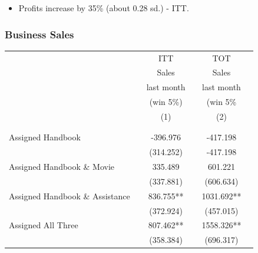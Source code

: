 \documentclass[hideothersubsections, usenames,dvipsnames,10pt]{beamer}
\begin{document}
\begin{frame}
{{\begin{table}[t]
\end{table}}}
\begin{itemize}
\item Profits increase by 35\% (about 0.28 sd.) - ITT.
\end{itemize}
\end{frame}




\begin{frame}
\frametitle{Business Sales}
{\scriptsize{\begin{table}[t]
\centering
	\begin{tabular}{l*{5}{c}}
\hline
\hline
                &&ITT	        &&TOT \\
			   &&Sales	        &&Sales \\
				&&last month  		&&last month \\
			&&(win 5\%)			&&(win 5\% \\
				&&(1)				&&(2)	\\
&& \\
					\hline
&&\\
		

Assigned Handbook 					&&-396.976   	&&               -417.198		\\
       								 	&&        (314.252)   	&&          -417.198	\\

         							
Assigned Handbook \& Movie				&&335.489   	  	&& 601.221    		\\
       									&&       (337.881)  	&&            (606.634)	\\

         							
Assigned Handbook \& Assistance 	&&                   836.755**	&&                     1031.692** 	\\
       								 	&&        (372.924) 	&&            (457.015) 	\\
         							
Assigned All Three         		&&         807.462**  	&&                         1558.326**		\\
       								 	&&        (358.384)  	&&          (696.317)   	\\


\end{tabular}
\end{table}}}
\end{frame}
\end{document}
